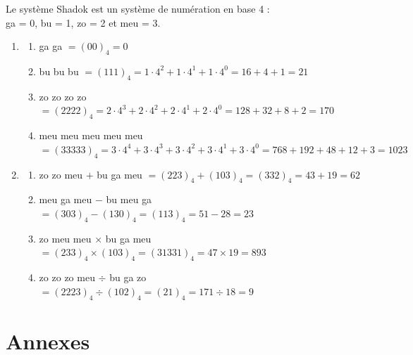 \begin{description}
	Le système Shadok est un système de numération en base 4 :\\
	{\sc ga} = 0, {\sc bu} = 1, {\sc zo} = 2 et {\sc meu} = 3.
	\begin{enumerate}
	\item   \begin{enumerate}
		\item {\sc ga} {\sc ga} 
			$= (00)_4 = 0$
		\item {\sc bu} {\sc bu} {\sc bu} 
			$= (111)_4 = 1\cdot 4^2 + 1\cdot 4^1 + 1\cdot 4^0 = 16 + 4 + 1 = 21$
		\item {\sc zo} {\sc zo} {\sc zo} {\sc zo} 
			$= (2222)_4 = 2\cdot 4^3 + 2\cdot 4^2 + 2\cdot 4^1 + 2\cdot 4^0 = 128 + 32 + 8 + 2 = 170$
		\item {\sc meu} {\sc meu} {\sc meu} {\sc meu} {\sc meu} 
			$= (33333)_4 = 3 \cdot 4^4 + 3\cdot 4^3 + 3\cdot 4^2 + 3\cdot 4^1 + 3\cdot 4^0 = 768 + 192 + 48 + 12 + 3 =
			1023$
		\end{enumerate}	
	\item	\begin{enumerate}
		\item {\sc zo} {\sc zo} {\sc meu} $+$ {\sc bu} {\sc ga} {\sc meu} 
			$= (223)_4 + (103)_4 = (332)_4 = 43 + 19 = 62$
		\item {\sc meu} {\sc ga} {\sc meu} $-$ {\sc bu} {\sc meu} {\sc ga} 
			$= (303)_4 - (130)_4 = (113)_4 = 51 - 28 = 23$
		\item {\sc zo} {\sc meu} {\sc meu} $\times$ {\sc bu} {\sc ga} {\sc meu} 
			$= (233)_4 \times (103)_4 = (31331)_4 = 47 \times 19 = 893$
		\item {\sc zo} {\sc zo} {\sc zo} {\sc meu} $\div$ {\sc bu} {\sc ga} {\sc zo} 
			$= (2223)_4 \div (102)_4 = (21)_4 = 171 \div 18 = 9$
		\end{enumerate}
	\end{enumerate}
\end{description}

\newpage
\setlength{\textwidth}{16cm}
\setlength{\linewidth}{16cm}
\setlength{\textheight}{16cm}
\setlength{\marginparwidth}{8cm}
\setlength{\marginparsep}{1cm}
\setlength{\oddsidemargin}{0cm}
\setlength{\evensidemargin}{+8cm}
\setlength{\topmargin}{-0.75cm}
\section{Annexes}

